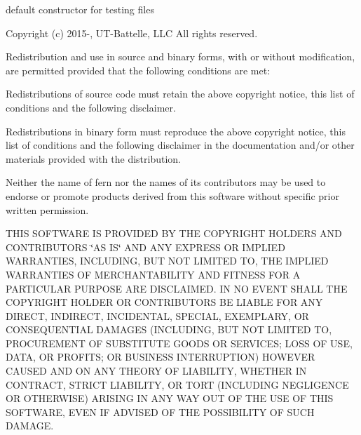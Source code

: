 default constructor for testing files



 Copyright (c) 2015-\/, U\+T-\/\+Battelle, L\+LC All rights reserved.

Redistribution and use in source and binary forms, with or without modification, are permitted provided that the following conditions are met\+:

Redistributions of source code must retain the above copyright notice, this list of conditions and the following disclaimer.

Redistributions in binary form must reproduce the above copyright notice, this list of conditions and the following disclaimer in the documentation and/or other materials provided with the distribution.

Neither the name of fern nor the names of its contributors may be used to endorse or promote products derived from this software without specific prior written permission.

T\+H\+IS S\+O\+F\+T\+W\+A\+RE IS P\+R\+O\+V\+I\+D\+ED BY T\+HE C\+O\+P\+Y\+R\+I\+G\+HT H\+O\+L\+D\+E\+RS A\+ND C\+O\+N\+T\+R\+I\+B\+U\+T\+O\+RS \char`\"{}\+A\+S I\+S\char`\"{} A\+ND A\+NY E\+X\+P\+R\+E\+SS OR I\+M\+P\+L\+I\+ED W\+A\+R\+R\+A\+N\+T\+I\+ES, I\+N\+C\+L\+U\+D\+I\+NG, B\+UT N\+OT L\+I\+M\+I\+T\+ED TO, T\+HE I\+M\+P\+L\+I\+ED W\+A\+R\+R\+A\+N\+T\+I\+ES OF M\+E\+R\+C\+H\+A\+N\+T\+A\+B\+I\+L\+I\+TY A\+ND F\+I\+T\+N\+E\+SS F\+OR A P\+A\+R\+T\+I\+C\+U\+L\+AR P\+U\+R\+P\+O\+SE A\+RE D\+I\+S\+C\+L\+A\+I\+M\+ED. IN NO E\+V\+E\+NT S\+H\+A\+LL T\+HE C\+O\+P\+Y\+R\+I\+G\+HT H\+O\+L\+D\+ER OR C\+O\+N\+T\+R\+I\+B\+U\+T\+O\+RS BE L\+I\+A\+B\+LE F\+OR A\+NY D\+I\+R\+E\+CT, I\+N\+D\+I\+R\+E\+CT, I\+N\+C\+I\+D\+E\+N\+T\+AL, S\+P\+E\+C\+I\+AL, E\+X\+E\+M\+P\+L\+A\+RY, OR C\+O\+N\+S\+E\+Q\+U\+E\+N\+T\+I\+AL D\+A\+M\+A\+G\+ES (I\+N\+C\+L\+U\+D\+I\+NG, B\+UT N\+OT L\+I\+M\+I\+T\+ED TO, P\+R\+O\+C\+U\+R\+E\+M\+E\+NT OF S\+U\+B\+S\+T\+I\+T\+U\+TE G\+O\+O\+DS OR S\+E\+R\+V\+I\+C\+ES; L\+O\+SS OF U\+SE, D\+A\+TA, OR P\+R\+O\+F\+I\+TS; OR B\+U\+S\+I\+N\+E\+SS I\+N\+T\+E\+R\+R\+U\+P\+T\+I\+ON) H\+O\+W\+E\+V\+ER C\+A\+U\+S\+ED A\+ND ON A\+NY T\+H\+E\+O\+RY OF L\+I\+A\+B\+I\+L\+I\+TY, W\+H\+E\+T\+H\+ER IN C\+O\+N\+T\+R\+A\+CT, S\+T\+R\+I\+CT L\+I\+A\+B\+I\+L\+I\+TY, OR T\+O\+RT (I\+N\+C\+L\+U\+D\+I\+NG N\+E\+G\+L\+I\+G\+E\+N\+CE OR O\+T\+H\+E\+R\+W\+I\+SE) A\+R\+I\+S\+I\+NG IN A\+NY W\+AY O\+UT OF T\+HE U\+SE OF T\+H\+IS S\+O\+F\+T\+W\+A\+RE, E\+V\+EN IF A\+D\+V\+I\+S\+ED OF T\+HE P\+O\+S\+S\+I\+B\+I\+L\+I\+TY OF S\+U\+CH D\+A\+M\+A\+GE.

